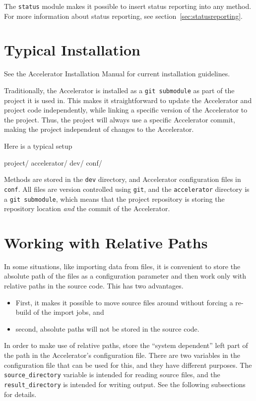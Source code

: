The \texttt{status} module makes it possible to insert
status reporting into any method.  For more information about status
reporting, see section~\ref{sec:statusreporting}.





\section{Typical Installation}

See the Accelerator Installation Manual for current installation
guidelines.

Traditionally, the Accelerator is installed as a \texttt{git
submodule} as part of the project it is used in.  This makes it
straightforward to update the Accelerator and project code
independently, while linking a specific version of the Accelerator to
the project.  Thus, the project will always use a specific Accelerator
commit, making the project independent of changes to the Accelerator.

Here is a typical setup
\begin{shell}
project/
    accelerator/
    dev/
    conf/
\end{shell}
Methods are stored in the \texttt{dev} directory, and Accelerator
configuration files in \texttt{conf}.  All files are version
controlled using \texttt{git}, and the \texttt{accelerator} directory
is a \texttt{git submodule}, which means that the project repository
is storing the repository location \textsl{and} the commit of the
Accelerator.





\section{Working with Relative Paths}

In some situations, like importing data from files, it is convenient
to store the absolute path of the files as a configuration parameter
and then work only with relative paths in the source code.  This has
two advantages.
\begin{itemize}
\item[] First, it makes it possible to move source files around without
forcing a re-build of the import jobs, and
\item[] second, absolute paths will not be stored in the source code.
\end{itemize}
In order to make use of relative paths, store the ``system dependent''
left part of the path in the Accelerator's configuration file.  There
are two variables in the configuration file that can be used for this,
and they have different purposes.  The \texttt{source\_directory}
variable is intended for reading source files, and
the \texttt{result\_directory} is intended for writing output.  See
the following subsections for details.


